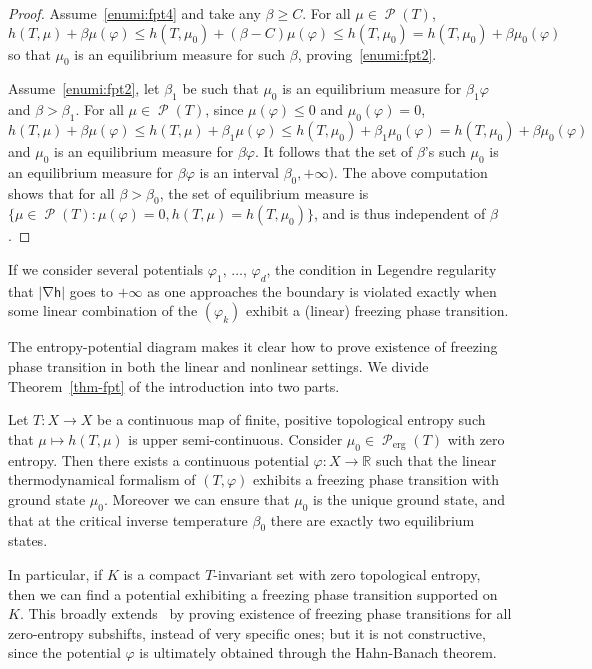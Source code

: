 \documentclass[AHL, Unicode, longabstracts,published]{cedram}
\theoremstyle{plain}
\theoremstyle{plain}
\newcommand\erg{\mathrm{erg}}
\newcommand\Prob{{\operatorname{\mathscr{P}}}}
\newcommand{\grad}{\operatorname{\nabla}}
\newcommand{\hf}{\mathsf{h}}
\newcommand{\pot}{\varphi}
\newcounter{In}
\newcommand*\8{\infty}
\newcommand\RR{\mathbb{R}}
\begin{document}
\begin{proof}
Assume~\eqref{enumi:fpt4} and take any $\beta\ge C$. For all $\mu\in\Prob(T)$,
\[
h(T,\mu)+\beta\mu(\pot) \le h(T,\mu_0) + (\beta-C) \mu(\pot) \le h(T,\mu_0) = h(T,\mu_0)+\beta\mu_0(\pot)
\]
so that $\mu_0$ is an equilibrium measure for such $\beta$, proving~\eqref{enumi:fpt2}.

Assume~\eqref{enumi:fpt2}, let $\beta_1$ be such that $\mu_0$ is an equilibrium measure for $\beta_1\pot$ and $\beta>\beta_1$. For all $\mu\in\Prob(T)$, since $\mu(\pot)\le 0$ and $\mu_0(\pot)=0$,
\[
h(T,\mu)+\beta\mu(\pot) \le h(T,\mu)+\beta_1\mu(\pot) \le h(T,\mu_0)+\beta_1\mu_0(\pot) = h(T,\mu_0)+\beta\mu_0(\pot)
\]
and $\mu_0$ is an equilibrium measure for $\beta\pot$. It follows that the set of $\beta$'s such $\mu_0$ is an equilibrium measure for $\beta\pot$ is an interval $\beta_0,+\infty)$. The above computation shows that for all $\beta>\beta_0$, the set of equilibrium measure is $\{\mu\in\Prob(T) \colon \mu(\pot)=0, h(T,\mu)=h(T,\mu_0) \}$, and is thus independent of $\beta$.
\end{proof}

\begin{rema}
If we consider several potentials $\pot_1,\,\dots,\,\pot_d$, the condition in Legendre regularity that $\lvert\grad \hf\rvert$ goes to $+\infty$ as one approaches the boundary is violated exactly when some linear combination of the $(\pot_k)$ exhibit a (linear) freezing phase transition.
\end{rema}

The entropy-potential diagram makes it {clear} how to prove existence of freezing phase transition in both the linear and nonlinear settings. We divide Theorem~\ref{thm-fpt} of the introduction into two parts.

\begin{theo}\label{thm-fpt-linear}
Let $T:X\to X$ be a continuous map of finite, positive topological entropy such that $\mu\mapsto h(T,\mu)$ is upper semi-continuous. Consider $\mu_0\in\Prob_\erg(T)$ with zero entropy. Then there exists a continuous potential $\pot:X\to \RR$ such that the linear thermodynamical formalism of $(T,\pot)$ exhibits a freezing phase transition with ground state $\mu_0$. Moreover we can ensure that $\mu_0$ is the unique ground state, and that at the critical inverse temperature $\beta_0$ there are exactly two equilibrium states.
\end{theo}

In particular, if $K$ is a compact $T$-invariant {set} with zero topological entropy, then we can find a potential exhibiting a freezing phase transition supported on $K$. This broadly extends~\cite{Bruin-Leplaideur1, Bruin-Leplaideur2} by proving existence of freezing phase transitions for all zero-entropy subshifts, instead of very specific ones; but it is not constructive, since the potential $\pot$ is ultimately obtained through the Hahn-Banach theorem.
\end{document}
